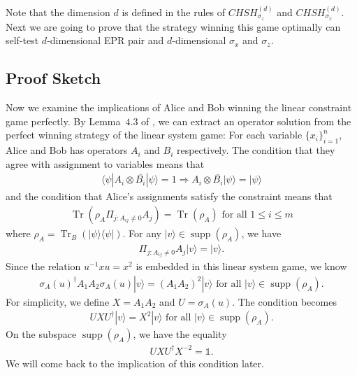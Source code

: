 \documentclass[11pt,letterpaper]{article}
\newcommand{\ket}[1]{|#1\rangle}
\newcommand{\bra}[1]{\langle#1|}
\newcommand{\ketbra}[2]{|#1\rangle\langle#2|}
\DeclareMathOperator{\Tr}{Tr}
\DeclareMathOperator{\supp}{supp}
\newcommand{\1}{\mathbb{1}}
\newcommand{\CHSH}{CHSH^{(d)}}
\theoremstyle{definition}
\begin{document}
Note that the dimension $d$ is defined in the rules of $\CHSH_{\sigma_z}$ and $\CHSH_{\sigma_x}$.
Next we are going to prove that the strategy winning this game optimally can self-test $d$-dimensional EPR pair and 
$d$-dimensional $\sigma_x$ and $\sigma_z$.
\subsection{Proof Sketch}
Now we examine the implications of Alice and Bob winning the linear constraint game perfectly.
By Lemma~$4.3$ of \cite{coladan2017}, we can extract an operator solution from the perfect winning strategy 
of the linear system game: 
For each variable $\{ x_i \}_{i=1}^n$, Alice and Bob has operators $A_i$ and $B_i$ respectively.
The condition that they agree with assignment to variables means that 
\begin{align}
	\bra{\psi} A_i \otimes \overline{B_i} \ket{\psi} = 1 \Rightarrow A_i \otimes \overline{B_i} \ket{\psi} = \ket{\psi}
\end{align}
and the condition that Alice's assignments satisfy the constraint means that 
\begin{align}
	\Tr(\rho_A \Pi_{j: A_{ij} \neq 0} A_j) = \Tr(\rho_A) \text{ for all } 1 \leq i \leq m
\end{align}
where $\rho_A =  \Tr_B(\ketbra{\psi}{\psi})$.
For any $\ket{v} \in \supp(\rho_A)$,
we have 
\begin{align}
\Pi_{j:A_{ij} \neq 0} A_j \ket{v} = \ket{v}.
\end{align}
Since the relation $u^{-1}xu = x^2$ is embedded in this linear system game, we know
\begin{align}
	\sigma_A(u)^\dagger A_1A_2 \sigma_A(u) \ket{v}= (A_1A_2)^2 \ket{v} \text{ for all } \ket{v} \in \supp(\rho_A).
\end{align}
For simplicity, we define $X = A_1A_2$ and $U = \sigma_A(u)$.
The condition becomes
\begin{align}
	UXU^\dagger \ket{v} = X^2 \ket{v} \text{ for all } \ket{v} \in \supp(\rho_A).
\end{align}
On the subspace $\supp(\rho_A)$, we have the equality
\begin{align}
	\label{eq:sim}
	UXU^\dagger X^{-2} = \1.
\end{align}
We will come back to the implication of this condition later.
\end{document}
